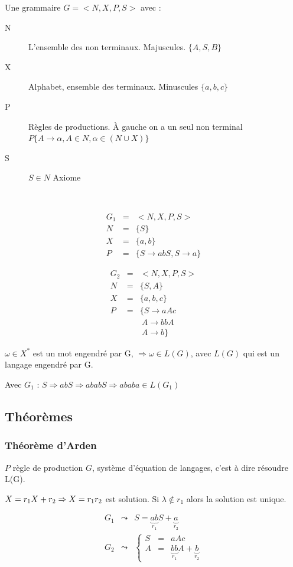 \documentclass[12pt,a4paper,openany]{book}
\begin{document}
	Une grammaire $G=<N,X,P,S>$ avec : 
	\begin{description}
		\item[N] L'ensemble des non terminaux. Majuscules. $\{A,S,B\}$
		\item[X] Alphabet, ensemble des terminaux. Minuscules $\{a,b,c\}$
		\item[P] Règles de productions. À gauche on a un seul non terminal $P\{A \rightarrow \alpha, A\in N, \alpha\in(N \cup X)\}$ 
		\item[S] $S\in N$ Axiome 
	\end{description}
~

\begin{exemple}
	\begin{eqnarray*}
	G_1&=& <N,X,P,S>\\
	N&=& \{S\}\\
	X&=& \{a,b\}\\
	P&=& \{S \rightarrow abS, S\rightarrow a\}
	\end{eqnarray*}
	\end{exemple}
	\begin{exemple}
	\begin{eqnarray*}
		G_2 &=&  <N,X,P,S>\\
		N &=& \{S,A\}\\
		X&=& \{a,b,c\}\\
		P&=& \{S \rightarrow aAc\\
		&& \ A\rightarrow bbA\\
		&& \ A\rightarrow b\}
	\end{eqnarray*}
\end{exemple}

$\omega \in X^*$ est un mot engendré par G, $\Rightarrow \omega \in L(G)$, avec $L(G)$ qui est un langage engendré par G.

\begin{exemple}
	Avec $G_1$ : 
	$S \Rightarrow abS \Rightarrow ababS \Rightarrow ababa\in L(G_1)$
\end{exemple}

\subsection{Théorèmes}
\subsubsection{Théorème d'Arden}
$P$ règle de production $G$, système d'équation de langages, c'est à dire résoudre L(G).

	$X =  r_1 X + r_2 \Rightarrow X = r_1\* r_2$ est solution. Si $\lambda \not\in r_1$ alors la solution est unique.
\begin{exemple}
	\begin{eqnarray*}
		G_1 &\leadsto& S = \underbrace{ab}_{r_1}S + \underbrace{a}_{r_2}\\
		G_2 &\leadsto& \left\{\begin{array}{ccc} S& =& aAc\\
			A& =& \underbrace{bb}_{r_1}A+\underbrace{b}_{r_2}\end{array}\right.
	\end{eqnarray*}
\end{exemple}
\end{document}
